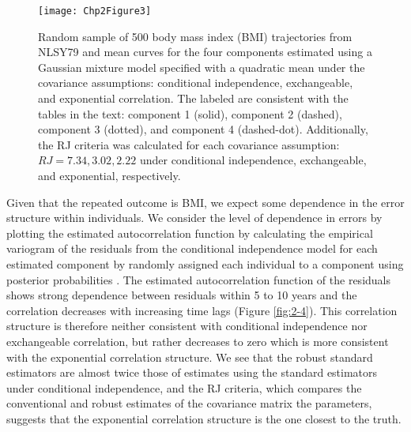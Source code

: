 \begin{figure}
\begin{center}
\texttt{[image: Chp2Figure3]}
\end{center}
\caption{Random sample of 500 body mass index (BMI) trajectories from NLSY79 and mean curves for the four components estimated using a Gaussian mixture model specified with a quadratic mean under the covariance assumptions: conditional independence, exchangeable, and exponential correlation. The labeled are consistent with the tables in the text: component 1 (solid), component 2 (dashed), component 3 (dotted), and component 4 (dashed-dot). Additionally, the RJ criteria was calculated for each covariance assumption: $RJ =7.34,3.02,2.22$ under conditional independence, exchangeable, and exponential, respectively.}
\label{fig:2-3}
\end{figure}

Given that the repeated outcome is BMI, we expect some dependence in the error structure within individuals.  We consider the level of dependence in errors by plotting the estimated autocorrelation function by calculating the empirical variogram of the residuals from the conditional independence model \cite{diggle2002} for each estimated component by randomly assigned each individual to a component using posterior probabilities \cite{wang2005}. The estimated autocorrelation function of the residuals shows strong dependence between residuals within 5 to 10 years and the correlation decreases with increasing time lags (Figure \ref{fig:2-4}). This correlation structure is therefore neither consistent with conditional independence nor exchangeable correlation, but rather decreases to zero which is more consistent with the exponential correlation structure. We see that the robust standard estimators are almost twice those of estimates using the standard estimators under conditional independence, and the RJ criteria, which compares the conventional and robust estimates of the covariance matrix the parameters, suggests that the exponential correlation structure is the one closest to the truth. 

